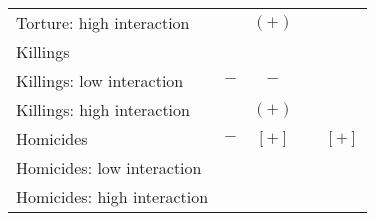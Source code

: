 \begin{table}[!htbp]
\begin{tabular}{lc|c|c|c}
\qquad Torture: high interaction                  &       & $(+)$   &         & \\
Killings                                          &       &         &         & \\
\qquad Killings: low interaction                  & $-$   & $-$     &         & \\
\qquad Killings: high interaction                 &       & $(+)$   &         & \\
Homicides                                         & $-$   & $[+]$   &         & $[+]$ \\
\qquad Homicides: low interaction                 &       &         &         & \\
\qquad Homicides: high interaction                &       &         &         & \\
\bottomrule
\end{tabular}
\end{table}
